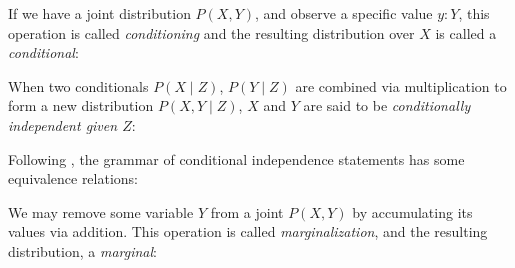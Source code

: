 \documentclass{article}
\begin{document}
If we have a joint distribution $P(X, Y)$, and observe a specific value $y: Y$, this operation is called \textit{conditioning} and the resulting distribution over $X$ is called a \textit{conditional}:

\begin{prooftree}
\end{prooftree}

When two conditionals $P(X \mid Z)$, $P(Y \mid Z)$ are combined via multiplication to form a new distribution $P(X, Y \mid Z)$, $X$ and $Y$ are said to be \textit{conditionally independent given $Z$}:

\begin{prooftree}
\end{prooftree}


%
%

Following \citet{pearl1985graphoids}, the grammar of conditional independence statements has some equivalence relations:



We may remove some variable $Y$ from a joint $P(X, Y)$ by accumulating its values via addition. This operation is called \textit{marginalization}, and the resulting distribution, a \textit{marginal}:

\begin{prooftree}
\end{prooftree}
\end{document}
